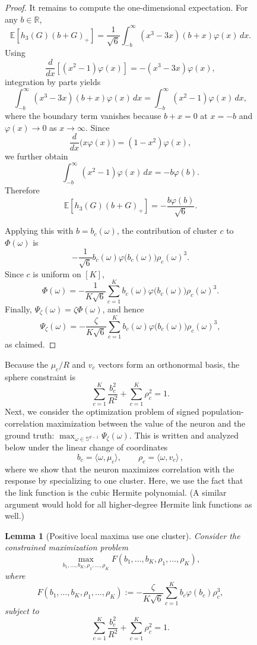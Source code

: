 \documentclass{article}
\newtheorem{lemma}[lemma]{Lemma}
\begin{document}
\begin{figure}
\begin{proof}
It remains to compute the one-dimensional expectation. For any $b\in\mathbb R$,
\[
    \mathbb E\left[h_3(G)(b+G)_+\right]
    =
    \frac1{\sqrt6}
    \int_{-b}^{\infty}
        (x^3-3x)(b+x)\varphi(x)\,dx.
\]
Using
\[
    \frac{d}{dx}
    \left[(x^2-1)\varphi(x)\right]
    =
    -(x^3-3x)\varphi(x),
\]
integration by parts yields
\[
    \int_{-b}^{\infty}
        (x^3-3x)(b+x)\varphi(x)\,dx
    =
    \int_{-b}^{\infty}
        (x^2-1)\varphi(x)\,dx,
\]
where the boundary term vanishes because $b+x=0$ at $x=-b$ and
$\varphi(x)\to0$ as $x\to\infty$. Since
\[
    \frac{d}{dx}\bigl(x\varphi(x)\bigr)
    =
    (1-x^2)\varphi(x),
\]
we further obtain
\[
    \int_{-b}^{\infty}
        (x^2-1)\varphi(x)\,dx
    =
    -b\varphi(b).
\]
Therefore
\[
    \mathbb E\left[h_3(G)(b+G)_+\right]
    =
    -\frac{b\varphi(b)}{\sqrt6}.
\]

Applying this with $b=b_c(\omega)$, the contribution of cluster $c$ to
$\Phi(\omega)$ is
\[
    -\frac{1}{\sqrt6}
    b_c(\omega)\varphi\bigl(b_c(\omega)\bigr)\rho_c(\omega)^3.
\]
Since $c$ is uniform on $[K]$,
\[
    \Phi(\omega)
    =
    -\frac1{K\sqrt6}
    \sum_{c=1}^K
    b_c(\omega)\varphi\bigl(b_c(\omega)\bigr)\rho_c(\omega)^3.
\]
Finally, $\Psi_\zeta(\omega)=\zeta\Phi(\omega)$, and hence
\[
    \Psi_\zeta(\omega)
    =
    -\frac{\zeta}{K\sqrt6}
    \sum_{c=1}^K
    b_c(\omega)\varphi\bigl(b_c(\omega)\bigr)\rho_c(\omega)^3,
\]
as claimed.
\end{proof}


Because the $\mu_c/R$ and $v_c$ vectors
form an orthonormal basis, the
sphere constraint is
\[
    \sum_{c=1}^K\frac{b_c^2}{R^2}
    +
    \sum_{c=1}^K\rho_c^2
    =
    1.
\]
Next, we consider the optimization problem of signed population-correlation maximization between the value of the neuron and the ground truth:
$\max_{\omega\in\mathbb S^{d-1}}\Psi_\zeta(\omega)$. This is written and analyzed below under the linear change of
coordinates
\[
    b_c=\langle\omega,\mu_c\rangle,
    \qquad
    \rho_c=\langle\omega,v_c\rangle\,,
\]
where we show that the neuron maximizes correlation with the response by specializing to one cluster. Here, we use the fact that the link function is the cubic Hermite polynomial. (A similar argument would hold for all higher-degree Hermite link functions as well.)

\begin{lemma}[Positive local maxima use one cluster]
\label{lem:one-cluster-maxima}
Consider the constrained maximization problem
\[
    \max_{b_1,\ldots,b_K,\rho_1,\ldots,\rho_K}
    F(b_1,\ldots,b_K,\rho_1,\ldots,\rho_K),
\]
where
\[
    F(b_1,\ldots,b_K,\rho_1,\ldots,\rho_K)
    :=
    -\frac{\zeta}{K\sqrt6}
    \sum_{c=1}^K
    b_c\varphi(b_c)\rho_c^3,
\]
subject to
\[
    \sum_{c=1}^K\frac{b_c^2}{R^2}
    +
    \sum_{c=1}^K\rho_c^2
    =
    1.
\]


\end{lemma}
\end{figure}
\end{document}

